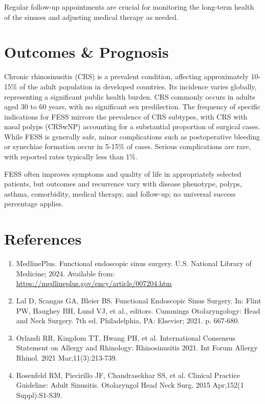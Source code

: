 Regular follow-up appointments are crucial for monitoring the long-term health of the sinuses and adjusting medical therapy as needed.

\section*{Outcomes \& Prognosis}
Chronic rhinosinusitis (CRS) is a prevalent condition, affecting approximately 10-15\% of the adult population in developed countries. Its incidence varies globally, representing a significant public health burden. CRS commonly occurs in adults aged 30 to 60 years, with no significant sex predilection. The frequency of specific indications for FESS mirrors the prevalence of CRS subtypes, with CRS with nasal polyps (CRSwNP) accounting for a substantial proportion of surgical cases. While FESS is generally safe, minor complications such as postoperative bleeding or synechiae formation occur in 5-15\% of cases. Serious complications are rare, with reported rates typically less than 1\%.

FESS often improves symptoms and quality of life in appropriately selected patients, but outcomes and recurrence vary with disease phenotype, polyps, asthma, comorbidity, medical therapy, and follow-up; no universal success percentage applies.

\section*{References}
\begin{enumerate}
  \item MedlinePlus. Functional endoscopic sinus surgery. U.S. National Library of Medicine; 2024. Available from: \url{https://medlineplus.gov/ency/article/007204.htm}
  \item Lal D, Scangas GA, Bleier BS. Functional Endoscopic Sinus Surgery. In: Flint PW, Haughey BH, Lund VJ, et al., editors. Cummings Otolaryngology: Head and Neck Surgery. 7th ed. Philadelphia, PA: Elsevier; 2021. p. 667-680.
  \item Orlandi RR, Kingdom TT, Hwang PH, et al. International Consensus Statement on Allergy and Rhinology: Rhinosinusitis 2021. Int Forum Allergy Rhinol. 2021 Mar;11(3):213-739.
  \item Rosenfeld RM, Piccirillo JF, Chandrasekhar SS, et al. Clinical Practice Guideline: Adult Sinusitis. Otolaryngol Head Neck Surg. 2015 Apr;152(1 Suppl):S1-S39.
\end{enumerate}

\clearpage
